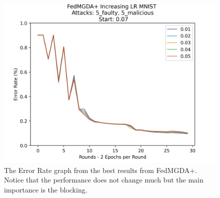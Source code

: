 \begin{figure}[htbp]
    \centering
    \includegraphics[scale=0.7]{initial/graphs/best_fed_result.png}
    \caption{The Error Rate graph from the best results from FedMGDA+. Notice that the performance does not change much but the main importance is the blocking.}
    \label{fig:best_fedmgda+}
\end{figure}

